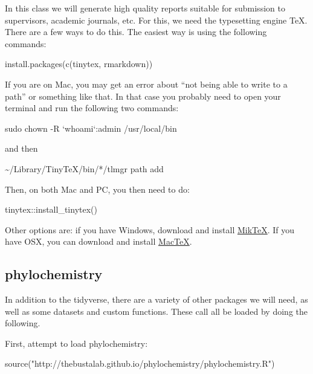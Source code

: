 \documentclass[
]{krantz}
\newenvironment{Shaded}{\begin{snugshade}}{\end{snugshade}}
\newcommand{\FunctionTok}[1]{\textcolor[rgb]{0.00,0.00,0.00}{#1}}
\newcommand{\NormalTok}[1]{#1}
\newcommand{\SpecialCharTok}[1]{\textcolor[rgb]{0.00,0.00,0.00}{#1}}
\newcommand{\StringTok}[1]{\textcolor[rgb]{0.31,0.60,0.02}{#1}}
\begin{document}
In this class we will generate high quality reports suitable for submission to supervisors, academic journals, etc. For this, we need the typesetting engine TeX. There are a few ways to do this. The easiest way is using the following commands:

\begin{Shaded}
\begin{Highlighting}[]
\FunctionTok{install.packages}\NormalTok{(}\FunctionTok{c}\NormalTok{(}\StringTok{\textquotesingle{}tinytex\textquotesingle{}}\NormalTok{, }\StringTok{\textquotesingle{}rmarkdown\textquotesingle{}}\NormalTok{))}
\end{Highlighting}
\end{Shaded}

If you are on Mac, you may get an error about ``not being able to write to a path'' or something like that. In that case you probably need to open your terminal and run the following two commands:

sudo chown -R `whoami`:admin /usr/local/bin

and then

\textasciitilde/Library/TinyTeX/bin/*/tlmgr path add

Then, on both Mac and PC, you then need to do:

\begin{Shaded}
\begin{Highlighting}[]
\NormalTok{tinytex}\SpecialCharTok{::}\FunctionTok{install\_tinytex}\NormalTok{()}
\end{Highlighting}
\end{Shaded}

Other options are: if you have Windows, download and install \href{https://miktex.org/download}{MikTeX}. If you have OSX, you can download and install \href{http://www.tug.org/mactex/morepackages.html}{MacTeX}.

\hypertarget{phylochemistry}{%
\subsection{phylochemistry}\label{phylochemistry}}

In addition to the tidyverse, there are a variety of other packages we will need, as well as some datasets and custom functions. These call all be loaded by doing the following.

First, attempt to load phylochemistry:

\begin{Shaded}
\begin{Highlighting}[]
\FunctionTok{source}\NormalTok{(}\StringTok{"http://thebustalab.github.io/phylochemistry/phylochemistry.R"}\NormalTok{)}
\end{Highlighting}
\end{Shaded}
\end{document}

